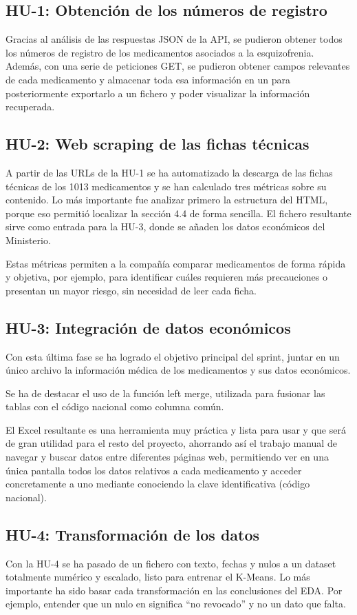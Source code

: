 \documentclass[11pt,a4paper]{article}
\begin{document}
\subsection{HU-1: Obtención de los números de registro}
Gracias al análisis de las respuestas JSON de la API, se pudieron obtener todos los números
de registro de los medicamentos asociados a la esquizofrenia. Además, con una serie de
peticiones GET, se pudieron obtener campos relevantes de cada medicamento y almacenar
toda esa información en un  para posteriormente exportarlo a un fichero  y
poder visualizar la información recuperada.

\subsection{HU-2: Web scraping de las fichas técnicas}
A partir de las URLs de la HU-1 se ha automatizado la descarga de las fichas técnicas de los
1013 medicamentos y se han calculado tres métricas sobre su contenido. Lo más importante fue
analizar primero la estructura del HTML, porque eso permitió localizar la sección 4.4 de forma
sencilla. El fichero resultante sirve como entrada para la HU-3, donde se añaden los datos
económicos del Ministerio.

Estas métricas permiten a la compañía comparar medicamentos de forma rápida y objetiva, por
ejemplo, para identificar cuáles requieren más precauciones o presentan un mayor riesgo, sin
necesidad de leer cada ficha.

\subsection{HU-3: Integración de datos económicos}
Con esta última fase se ha logrado el objetivo principal del sprint, juntar en un único archivo la
información médica de los medicamentos y sus datos económicos.

Se ha de destacar el uso de la función left merge, utilizada para fusionar las tablas con el código
nacional como columna común.

El Excel resultante es una herramienta muy práctica y lista para usar y que será de gran utilidad
para el resto del proyecto, ahorrando así el trabajo manual de navegar y buscar datos entre
diferentes páginas web, permitiendo ver en una única pantalla todos los datos relativos a
cada medicamento y acceder concretamente a uno mediante conociendo la clave identificativa
(código nacional).

\subsection{HU-4: Transformación de los datos}
Con la HU-4 se ha pasado de un fichero con texto, fechas y nulos a un dataset totalmente
numérico y escalado, listo para entrenar el K-Means. Lo más importante ha sido basar cada
transformación en las conclusiones del EDA. Por ejemplo, entender que un nulo en 
significa ``no revocado'' y no un dato que falta.
\end{document}
